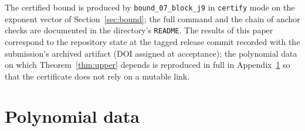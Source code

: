 \documentclass[11pt,reqno]{amsart}
\theoremstyle{plain}
\theoremstyle{definition}
\begin{document}
The certified bound is produced by \texttt{bound\_07\_block\_j9} in \texttt{certify}
mode on the exponent vector of Section~\ref{sec:bound}; the full command and the
chain of anchor checks are documented in the directory's \texttt{README}. The
results of this paper correspond to the repository state at the tagged release commit
recorded with the submission's archived artifact (DOI assigned at acceptance); the
polynomial data on which Theorem~\ref{thm:upper} depends is reproduced in full in
Appendix~\ref{app:data} so that the certificate does not rely on a mutable link.

\appendix
\section{Polynomial data}\label{app:data}
\end{document}
